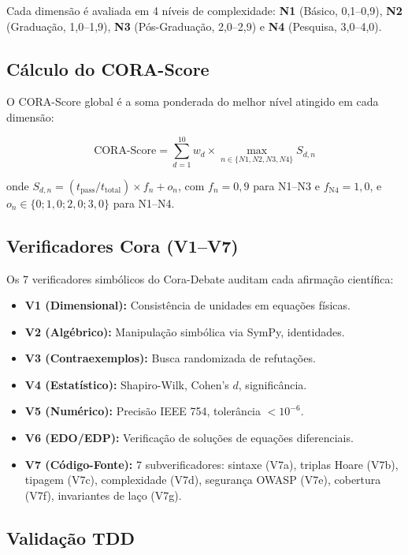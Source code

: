 \documentclass[12pt,a4paper]{article}
\begin{document}
Cada dimensão é avaliada em 4 níveis de complexidade:
\textbf{N1} (Básico, 0,1--0,9), \textbf{N2} (Graduação, 1,0--1,9),
\textbf{N3} (Pós-Graduação, 2,0--2,9) e \textbf{N4} (Pesquisa, 3,0--4,0).

\subsection{Cálculo do CORA-Score}

O CORA-Score global é a soma ponderada do melhor nível atingido em cada dimensão:

\begin{equation}\label{eq:corascore}
\text{CORA-Score} = \sum_{d=1}^{10} w_d \times \max_{n \in \{N1,N2,N3,N4\}} S_{d,n}
\end{equation}

onde $S_{d,n} = (t_{\text{pass}}/t_{\text{total}}) \times f_n + o_n$, com
$f_n = 0{,}9$ para N1--N3 e $f_{\text{N4}} = 1{,}0$, e
$o_n \in \{0; 1{,}0; 2{,}0; 3{,}0\}$ para N1--N4.

\subsection{Verificadores Cora (V1--V7)}

Os 7 verificadores simbólicos do Cora-Debate auditam cada afirmação científica:

\begin{itemize}
\item \textbf{V1 (Dimensional):} Consistência de unidades em equações físicas.
\item \textbf{V2 (Algébrico):} Manipulação simbólica via SymPy, identidades.
\item \textbf{V3 (Contraexemplos):} Busca randomizada de refutações.
\item \textbf{V4 (Estatístico):} Shapiro-Wilk, Cohen's $d$, significância.
\item \textbf{V5 (Numérico):} Precisão IEEE 754, tolerância $< 10^{-6}$.
\item \textbf{V6 (EDO/EDP):} Verificação de soluções de equações diferenciais.
\item \textbf{V7 (Código-Fonte):} 7 subverificadores: sintaxe (V7a), triplas
      Hoare (V7b), tipagem (V7c), complexidade (V7d), segurança OWASP (V7e),
      cobertura (V7f), invariantes de laço (V7g).
\end{itemize}

\subsection{Validação TDD}
\end{document}
